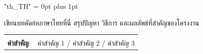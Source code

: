 {
\XeTeXlinebreaklocale "th_TH"
\XeTeXlinebreakskip = 0pt plus 1pt
\thaifont
\thaiabstract

เขียนบทคัดย่อภาษาไทยที่นี่ สรุปปัญหา วิธีการ และผลลัพธ์ที่สำคัญของโครงงาน\par

\begin{flushleft}
\begin{tabular*}{\textwidth}{@{}lp{}}
 & \\
\textbf{คำสำคัญ}: & คำสำคัญ 1 / คำสำคัญ 2 / คำสำคัญ 3
\end{tabular*}
\end{flushleft}
\endabstract
}
